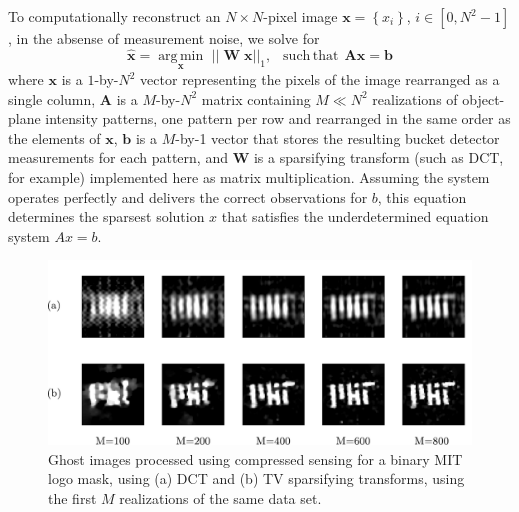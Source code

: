 To computationally reconstruct an $N \times N$-pixel image $\mathbf{x} = \left\{ x_i \right\}$, $i \in [0, N^2-1]$, in the absense of measurement noise, we solve for
\begin{equation}
\hat{\mathbf{x}} = \underset{\mathbf{x}}{\operatorname{arg\,min}}\,\,||\operatorname{\mathbf{W}}\mathbf{x}||_1,\,\,\, \operatorname{such\,that}\,\mathbf{A}\mathbf{x} = \mathbf{b}
\end{equation}
where $\mathbf{x}$ is a $1$-by-$N^2$ vector representing the pixels of the image rearranged as a single column, $\mathbf{A}$ is a $M$-by-$N^2$ matrix containing $M \ll N^2$ realizations of object-plane intensity patterns, one pattern per row and rearranged in the same order as the elements of $\mathbf{x}$, $\mathbf{b}$ is a $M$-by-1 vector that stores the resulting bucket detector measurements for each pattern, and $\mathbf{W}$ is a sparsifying transform (such as DCT, for example) implemented here as matrix multiplication. Assuming the system operates perfectly and delivers the correct observations for $b$, this equation determines the sparsest solution $x$ that satisfies the underdetermined equation system $Ax = b$.

\begin{figure}[t]
\begin{center}
\includegraphics[width=16cm]{figure-ghost-compressed-dctvstv.pdf}
\caption{Ghost images processed using compressed sensing for a binary MIT logo mask, using (a) DCT and (b) TV sparsifying transforms, using the first $M$ realizations of the same data set.}
\label{figure:ghost-compressed-dctvstv}
\end{center}
\end{figure}


